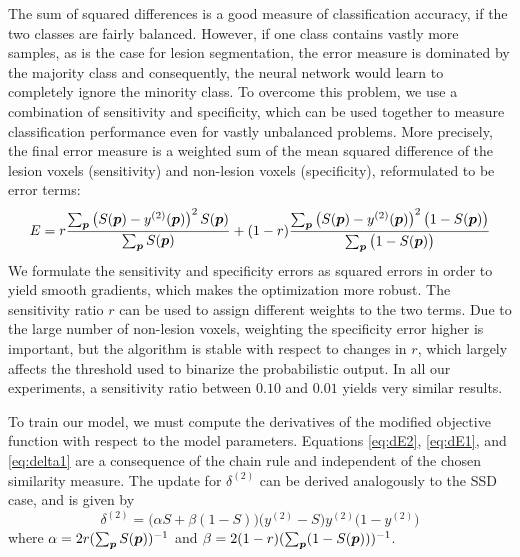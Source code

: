 The sum of squared differences is a good measure of classification accuracy, if
the two classes are fairly balanced. However, if one class contains vastly more
samples, as is the case for lesion segmentation, the error measure is dominated
by the majority class and consequently, the neural network would learn to
completely ignore the minority class. To overcome this problem, we use a
combination of sensitivity and specificity, which can be used together to
measure classification performance even for vastly unbalanced problems. More
precisely, the final error measure is a weighted sum of the mean squared
difference of the lesion voxels (sensitivity) and non-lesion voxels
(specificity), reformulated to be error terms:
\begin{equation} 
E = r\frac{\textstyle\sum_{\vect{p}} \left(S(\vect{p}) -
y^{(2)}(\vect{p})\right)^2 S(\vect{p})}{\textstyle\sum_{\vect{p}} S(\vect{p})}
  +
(1-r)\frac{\textstyle\sum_{\vect{p}} \left(S(\vect{p}) -
y^{(2)}(\vect{p})\right)^2 \big(1 - S(\vect{p})\big)}{%
\textstyle\sum_{\vect{p}}\big(1 - S(\vect{p})\big)}
\end{equation}
We formulate the sensitivity and specificity errors as squared errors in order
to yield smooth gradients, which makes the optimization more robust. The
sensitivity ratio $r$ can be used to assign different weights to the two terms.
Due to the large number of non-lesion voxels, weighting the specificity error
higher is important, but the algorithm is stable with respect to changes in $r$,
which largely affects the threshold used to binarize the probabilistic output.
In all our experiments, a sensitivity ratio between $0.10$ and $0.01$ yields
very similar results.

To train our model, we must compute the derivatives of the modified
objective function with respect to the model parameters. Equations \eqref{eq:dE2},
\eqref{eq:dE1}, and \eqref{eq:delta1} are a consequence of the chain rule
and independent of the chosen similarity measure.
The update for $\delta^{(2)}$ can be derived analogously to the SSD case,
and is given by
\begin{equation} 
\delta^{(2)} = \big(\alpha S + \beta (1 - S)\big)\big(y^{(2)} - S\big) y^{(2)}
\big(1 - y^{(2)}\big)
\end{equation}
where $\alpha = 2r (\sum_{\vect{p}}S(\vect{p}))^{-1}$ and $\beta = 2(1 -
r)(\sum_{\vect{p}}(1 - S(\vect{p})))^{-1}$.
